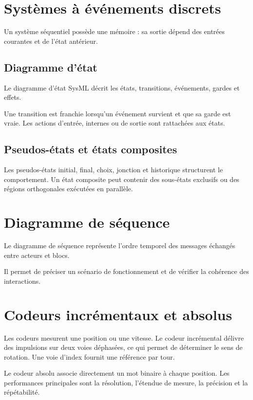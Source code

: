 \section{Systèmes à événements discrets}
Un système séquentiel possède une mémoire : sa sortie dépend des entrées courantes et de l'état antérieur.

\subsection{Diagramme d'état}
Le diagramme d'état SysML décrit les états, transitions, événements, gardes et effets.
\begin{center}\TLGrapheEtatsSimple\end{center}
Une transition est franchie lorsqu'un événement survient et que sa garde est vraie. Les actions d'entrée, internes ou de sortie sont rattachées aux états.

\subsection{Pseudos-états et états composites}
Les pseudos-états initial, final, choix, jonction et historique structurent le comportement. Un état composite peut contenir des sous-états exclusifs ou des régions orthogonales exécutées en parallèle.

\section{Diagramme de séquence}
Le diagramme de séquence représente l'ordre temporel des messages échangés entre acteurs et blocs.
\begin{center}\TLDiagrammeSequenceSimple\end{center}
Il permet de préciser un scénario de fonctionnement et de vérifier la cohérence des interactions.

\section{Codeurs incrémentaux et absolus}
Les codeurs mesurent une position ou une vitesse. Le codeur incrémental délivre des impulsions sur deux voies déphasées, ce qui permet de déterminer le sens de rotation. Une voie d'index fournit une référence par tour.
\begin{center}\TLCodeurIncremental\end{center}
Le codeur absolu associe directement un mot binaire à chaque position. Les performances principales sont la résolution, l'étendue de mesure, la précision et la répétabilité.

